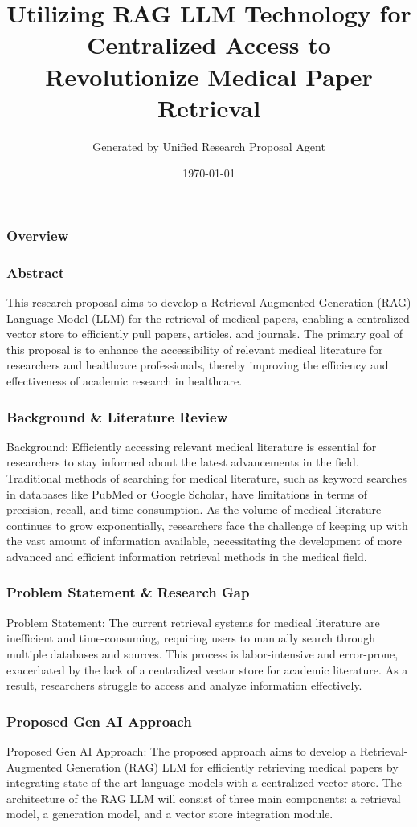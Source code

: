 \documentclass{beamer}
\title{Utilizing RAG LLM Technology for Centralized Access to Revolutionize Medical Paper Retrieval}
\author{Generated by Unified Research Proposal Agent}
\date{\today}
\begin{document}
\frame{\titlepage}

\begin{frame}
\frametitle{Overview}
\tableofcontents
\end{frame}

\begin{frame}
\frametitle{Abstract}
This research proposal aims to develop a Retrieval-Augmented Generation (RAG) Language Model (LLM) for the retrieval of medical papers, enabling a centralized vector store to efficiently pull papers, articles, and journals. The primary goal of this proposal is to enhance the accessibility of relevant medical literature for researchers and healthcare professionals, thereby improving the efficiency and effectiveness of academic research in healthcare.
\end{frame}

\begin{frame}
\frametitle{Background \& Literature Review}
Background:
Efficiently accessing relevant medical literature is essential for researchers to stay informed about the latest advancements in the field. Traditional methods of searching for medical literature, such as keyword searches in databases like PubMed or Google Scholar, have limitations in terms of precision, recall, and time consumption. As the volume of medical literature continues to grow exponentially, researchers face the challenge of keeping up with the vast amount of information available, necessitating the development of more advanced and efficient information retrieval methods in the medical field.
\end{frame}

\begin{frame}
\frametitle{Problem Statement \& Research Gap}
Problem Statement:
The current retrieval systems for medical literature are inefficient and time-consuming, requiring users to manually search through multiple databases and sources. This process is labor-intensive and error-prone, exacerbated by the lack of a centralized vector store for academic literature. As a result, researchers struggle to access and analyze information effectively.
\end{frame}

\begin{frame}
\frametitle{Proposed Gen AI Approach}
Proposed Gen AI Approach:
The proposed approach aims to develop a Retrieval-Augmented Generation (RAG) LLM for efficiently retrieving medical papers by integrating state-of-the-art language models with a centralized vector store. The architecture of the RAG LLM will consist of three main components: a retrieval model, a generation model, and a vector store integration module.
\end{frame}
\end{document}
